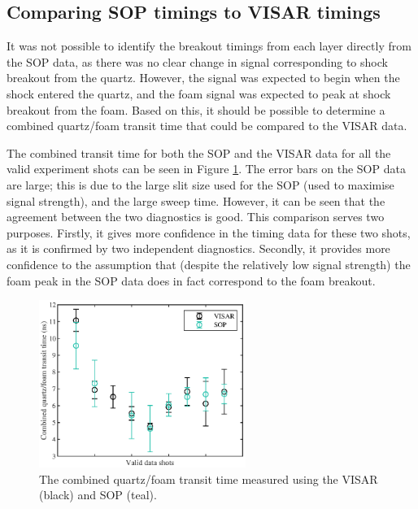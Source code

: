 \subsection{Comparing SOP timings to VISAR timings}
It was not possible to identify the breakout timings from each layer directly from the SOP data, as there was no clear change in signal corresponding to shock breakout from the quartz. However, the signal was expected to begin when the shock entered the quartz, and the foam signal was expected to peak at shock breakout from the foam. Based on this, it should be possible to determine a combined quartz/foam transit time that could be compared to the VISAR data.

The combined transit time for both the SOP and the VISAR data for all the valid experiment shots can be seen in Figure \ref{fig:SOP Timing}. The error bars on the SOP data are large; this is due to the large slit size used for the SOP (used to maximise signal strength), and the large sweep time. However, it can be seen that the agreement between the two diagnostics is good. This comparison serves two purposes. Firstly, it gives more confidence in the timing data for these two shots, as it is confirmed by two independent diagnostics. Secondly, it provides more confidence to the assumption that (despite the relatively low signal strength) the foam peak in the SOP data does in fact correspond to the foam breakout.

\begin{figure} [h!]
\begin{centering}
\includegraphics[width=0.6\textwidth]{figures/Experiment/SOPVISARtiming.eps}%
\caption{\label{fig:SOP Timing} The combined quartz/foam transit time measured using the VISAR (black) and SOP (teal).}
\end{centering}
\end{figure}






